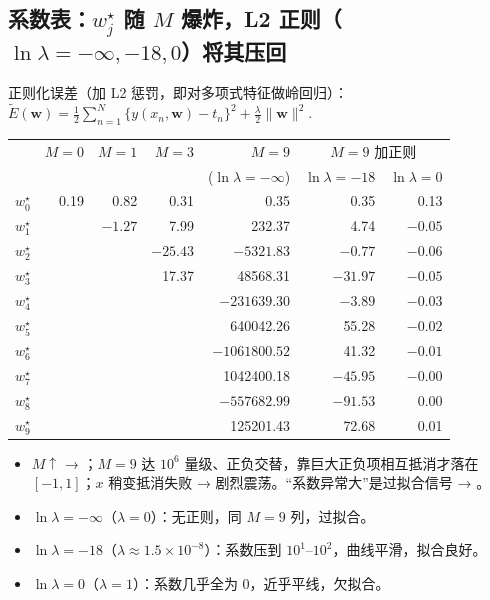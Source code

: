 \subsection{系数表：\texorpdfstring{$w_j^\star$}{w*} 随 \texorpdfstring{$M$}{M} 爆炸，L2 正则（\texorpdfstring{$\ln\lambda=-\infty,-18,0$}{ln lambda = -inf, -18, 0}）将其压回}
正则化误差（加 L2 惩罚，即对多项式特征做岭回归）：
$\displaystyle \tilde E(\bm w)=\frac12\sum_{n=1}^{N}\bigl\{y(x_n,\bm w)-t_n\bigr\}^2+\frac{\lambda}{2}\|\bm w\|^2 .$

\noindent
\begin{minipage}[t]{0.6\linewidth}\vspace{0pt}\footnotesize\setlength{\tabcolsep}{3pt}\renewcommand{\arraystretch}{1.08}
\begin{tabular}{@{}lrrrr|rr@{}}
\toprule
 & $M=0$ & $M=1$ & $M=3$ & $M=9$ & \multicolumn{2}{c}{$M=9$ 加正则} \\
 & & & & ($\ln\lambda=-\infty$) & $\ln\lambda=-18$ & $\ln\lambda=0$ \\
\midrule
$w_0^\star$ & 0.19 & 0.82 & 0.31 & 0.35 & 0.35 & 0.13 \\
$w_1^\star$ & & $-1.27$ & 7.99 & 232.37 & 4.74 & $-0.05$ \\
$w_2^\star$ & & & $-25.43$ & $-5321.83$ & $-0.77$ & $-0.06$ \\
$w_3^\star$ & & & 17.37 & 48568.31 & $-31.97$ & $-0.05$ \\
$w_4^\star$ & & & & $-231639.30$ & $-3.89$ & $-0.03$ \\
$w_5^\star$ & & & & 640042.26 & 55.28 & $-0.02$ \\
$w_6^\star$ & & & & $-1061800.52$ & 41.32 & $-0.01$ \\
$w_7^\star$ & & & & 1042400.18 & $-45.95$ & $-0.00$ \\
$w_8^\star$ & & & & $-557682.99$ & $-91.53$ & 0.00 \\
$w_9^\star$ & & & & 125201.43 & 72.68 & 0.01 \\
\bottomrule
\end{tabular}
\end{minipage}\hfill
\begin{minipage}[t]{0.385\linewidth}\vspace{0pt}\small
\begin{itemize}\setlength{\itemsep}{1pt}
\item $M\uparrow$ → ；$M=9$ 达 $10^6$ 量级、正负交替，靠巨大正负项相互抵消才落在 $[-1,1]$；$x$ 稍变抵消失败 → 剧烈震荡。“系数异常大”是过拟合信号 → 。
\item $\ln\lambda=-\infty$（$\lambda=0$）：无正则，同 $M=9$ 列，过拟合。
\item $\ln\lambda=-18$（$\lambda\approx1.5\times10^{-8}$）：系数压到 $10^1$–$10^2$，曲线平滑，拟合良好。
\item $\ln\lambda=0$（$\lambda=1$）：系数几乎全为 0，近乎平线，欠拟合。
\end{itemize}
\end{minipage}

